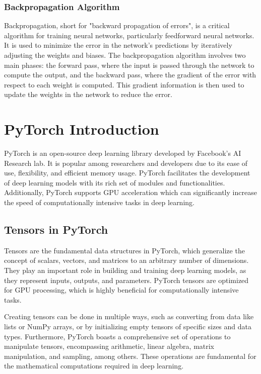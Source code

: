 \subsubsection{Backpropagation Algorithm}

Backpropagation, short for "backward propagation of errors", is a critical algorithm for training neural networks, particularly feedforward neural networks. It is used to minimize the error in the network's predictions by iteratively adjusting the weights and biases. The backpropagation algorithm involves two main phases: the forward pass, where the input is passed through the network to compute the output, and the backward pass, where the gradient of the error with respect to each weight is computed. This gradient information is then used to update the weights in the network to reduce the error.


\section{PyTorch Introduction}

PyTorch is an open-source deep learning library developed by Facebook's AI Research lab. It is popular among researchers and developers due to its ease of use, flexibility, and efficient memory usage. PyTorch facilitates the development of deep learning models with its rich set of modules and functionalities. Additionally, PyTorch supports GPU acceleration which can significantly increase the speed of computationally intensive tasks in deep learning.

\subsection{Tensors in PyTorch}

Tensors are the fundamental data structures in PyTorch, which generalize the concept of scalars, vectors, and matrices to an arbitrary number of dimensions. They play an important role in building and training deep learning models, as they represent inputs, outputs, and parameters. PyTorch tensors are optimized for GPU processing, which is highly beneficial for computationally intensive tasks.

Creating tensors can be done in multiple ways, such as converting from data like lists or NumPy arrays, or by initializing empty tensors of specific sizes and data types. Furthermore, PyTorch boasts a comprehensive set of operations to manipulate tensors, encompassing arithmetic, linear algebra, matrix manipulation, and sampling, among others. These operations are fundamental for the mathematical computations required in deep learning.

